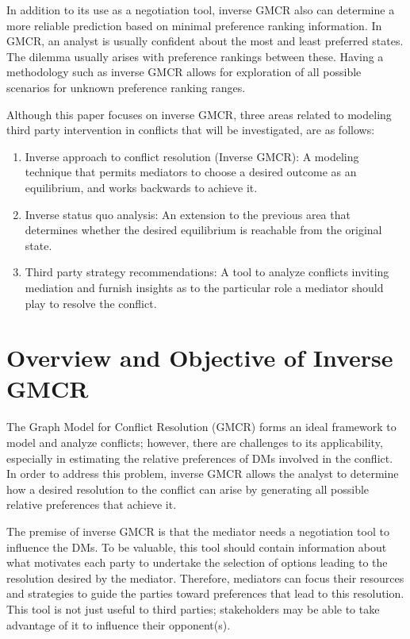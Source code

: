 \documentclass[letterpaper,12pt,titlepage,oneside,final]{book}
\begin{document}
In addition to its use as a negotiation tool, inverse GMCR also can determine a more reliable prediction based on minimal preference ranking information. In GMCR, an analyst is usually confident about the most and least preferred states. The dilemma usually arises with preference rankings between these. Having a methodology such as inverse GMCR allows for exploration of all possible scenarios for unknown preference ranking ranges.    



Although this paper focuses on inverse GMCR, three areas related to modeling third party intervention in conflicts that will be investigated, are as follows:
\begin{enumerate}
\item Inverse approach to conflict resolution (Inverse GMCR): A modeling technique that permits mediators to choose a desired outcome as an equilibrium, and works backwards to achieve it.
\item Inverse status quo analysis: An extension to the previous area that determines whether the desired equilibrium is reachable from the original state.
\item Third party strategy recommendations: A tool to analyze conflicts inviting mediation and furnish insights as to the particular role a mediator should play to resolve the conflict.

\end{enumerate}


\section{Overview and Objective of Inverse GMCR}

The Graph Model for Conflict Resolution (GMCR) forms an ideal framework to model and analyze conflicts; however, there are challenges to its applicability, especially in estimating the relative preferences of DMs involved in the conflict. In order to address this problem, inverse GMCR allows the analyst to determine how a desired resolution to the conflict can arise by generating all possible relative preferences that achieve it.

The premise of inverse GMCR is that the mediator needs a negotiation tool to influence the DMs. To be valuable, this tool should contain information about what motivates each party to undertake the selection of options leading to the resolution desired by the mediator. Therefore, mediators can focus their resources and strategies to guide the parties toward preferences that lead to this resolution. This tool is not just useful to third parties; stakeholders may be able to take advantage of it to influence their opponent(s).
\end{document}
